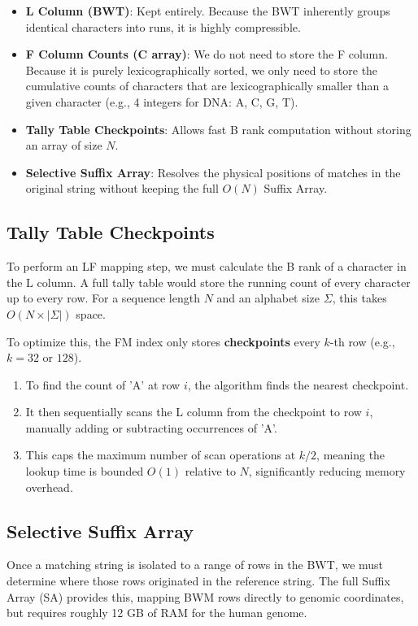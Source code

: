 \begin{itemize}
    \item \textbf{L Column (BWT)}: Kept entirely. Because the BWT inherently groups identical characters into runs, it is highly compressible.
    \item \textbf{F Column Counts (C array)}: We do not need to store the F column. Because it is purely lexicographically sorted, we only need to store the cumulative counts of characters that are lexicographically smaller than a given character (e.g., 4 integers for DNA: A, C, G, T).
    \item \textbf{Tally Table Checkpoints}: Allows fast B rank computation without storing an array of size $N$.
    \item \textbf{Selective Suffix Array}: Resolves the physical positions of matches in the original string without keeping the full $O(N)$ Suffix Array.
\end{itemize}

\subsection{Tally Table Checkpoints}

To perform an LF mapping step, we must calculate the B rank of a character in the L column. A full tally table would store the running count of every character up to every row. For a sequence length $N$ and an alphabet size $\Sigma$, this takes $O(N \times |\Sigma|)$ space. 

To optimize this, the FM index only stores \textbf{checkpoints} every $k$-th row (e.g., $k=32$ or $128$). 
\begin{enumerate}
    \item To find the count of 'A' at row $i$, the algorithm finds the nearest checkpoint.
    \item It then sequentially scans the L column from the checkpoint to row $i$, manually adding or subtracting occurrences of 'A'.
    \item This caps the maximum number of scan operations at $k/2$, meaning the lookup time is bounded $O(1)$ relative to $N$, significantly reducing memory overhead.
\end{enumerate}

\subsection{Selective Suffix Array}

Once a matching string is isolated to a range of rows in the BWT, we must determine where those rows originated in the reference string. The full Suffix Array (SA) provides this, mapping BWM rows directly to genomic coordinates, but requires roughly 12 GB of RAM for the human genome.

